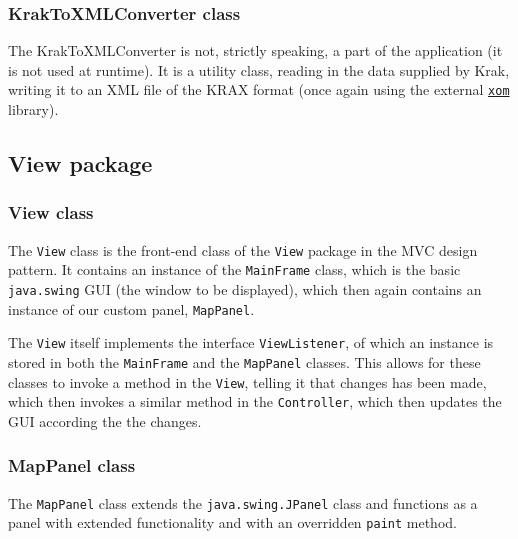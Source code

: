 \documentclass[a4paper,11pt]{article}
\begin{document}
\subsubsection{KrakToXMLConverter class} %
The KrakToXMLConverter is not, strictly speaking, a part of the application (it is not used at runtime). It is a utility class, reading in the data supplied by Krak, writing it to an XML file of the KRAX format (once again using the external \href{www.xom.nu}{\texttt{xom}} library).

\subsection{View package} %

\subsubsection{View class} %
The \texttt{View} class is the front-end class of the \texttt{View} package in the MVC design pattern. It contains an instance of the \texttt{MainFrame} class, which is the basic \texttt{java.swing} GUI (the window to be displayed), which then again contains an instance of our custom panel, \texttt{MapPanel}.

The \texttt{View} itself implements the interface \texttt{ViewListener}, of which an instance is stored in both the \texttt{MainFrame} and the \texttt{MapPanel} classes. This allows for these classes to invoke a method in the \texttt{View}, telling it that changes has been made, which then invokes a similar method in the \texttt{Controller}, which then updates the GUI according the the changes.

\subsubsection{MapPanel class} %
The \texttt{MapPanel} class extends the \texttt{java.swing.JPanel} class and functions as a panel with extended functionality and with an overridden \texttt{paint} method.
\end{document}
